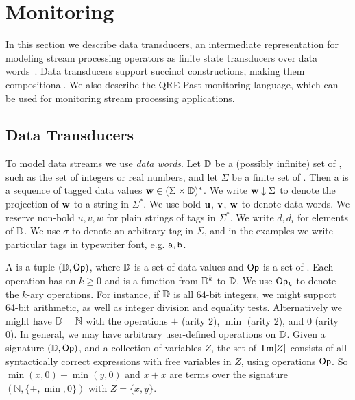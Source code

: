 \section{Monitoring}
\label{sec:monitoring}

In this section we describe data transducers,
an intermediate representation for modeling
stream processing operators as finite state transducers
over data words~.
Data transducers support succinct constructions, making them
compositional.
We also describe the QRE-Past monitoring language, which
can be used for monitoring stream processing applications.

\subsection{Data Transducers}
\label{sec:model}
\label{subsec:preliminaries}

To model data streams we use \emph{data words}.
Let $\mathbb{D}$ be a (possibly infinite) set of ,
such as the set of integers or real numbers,
and let $\Sigma$ be a finite set of .
Then a  is a sequence of tagged data values
$\textbf{w} \in (\Sigma \times \mathbb{D})^*$.
We write $\textbf{w} \downarrow \Sigma$ to denote
the projection of $\textbf{w}$ to a string in $\Sigma^*$.
We use bold $\textbf{u}$, $\textbf{v}$, $\textbf{w}$ to denote data words.
We reserve non-bold $u, v, w$ for plain strings of tags in $\Sigma^*$.
We write $d, d_i$ for elements of $\mathbb{D}$.
We use $\sigma$ to denote an arbitrary tag in $\Sigma$,
and in the examples we write particular tags in typewriter font, e.g. $\texttt{a}, \texttt{b}$.

A  is a tuple $(\mathbb{D}, \textsf{Op})$,
where $\mathbb{D}$ is a set of data values
and $\textsf{Op}$ is a set of .
Each operation has an  $k \ge 0$
and is a function from $\mathbb{D}^k$ to $\mathbb{D}$.
We use $\textsf{Op}_k$ to denote the $k$-ary operations.
For instance, if $\mathbb{D}$ is all 64-bit integers, we might support 64-bit arithmetic, as well as
integer division and equality tests.
Alternatively we might have $\mathbb{D} = \mathbb{N}$
with the operations $+$ (arity 2), $\min$ (arity 2), and $0$ (arity 0).
In general, we may have arbitrary user-defined operations on $\mathbb{D}$.
Given a signature $(\mathbb{D}, \textsf{Op})$,
and a collection of variables $Z$,
the set of  $\textsf{Tm}[Z]$
consists of all syntactically correct expressions
with free variables in $Z$, using operations $\textsf{Op}$.
So $\min(x,0) + \min(y,0)$ and $x + x$
are terms over the signature $(\mathbb{N}, \{+,\min,0\})$ with $Z = \{x,y\}$.

